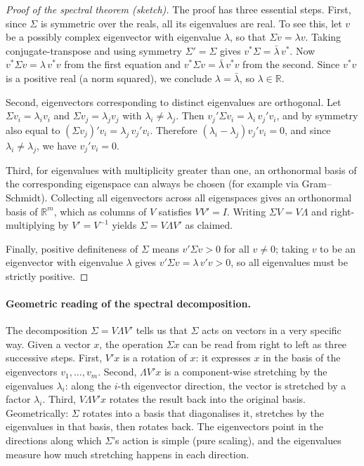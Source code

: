 \documentclass[11pt, a4paper, oneside]{article}
\begin{document}
\begin{proof}[Proof of the spectral theorem (sketch)]
The proof has three essential steps. First, since $\Sigma$ is symmetric
over the reals, all its eigenvalues are real. To see this, let $v$ be
a possibly complex eigenvector with eigenvalue $\lambda$, so that
$\Sigma v = \lambda v$. Taking conjugate-transpose and using symmetry
$\Sigma' = \Sigma$ gives $v^{*} \Sigma = \bar{\lambda}\, v^{*}$. Now
$v^{*} \Sigma v = \lambda\, v^{*} v$ from the first equation and
$v^{*} \Sigma v = \bar{\lambda}\, v^{*} v$ from the second. Since
$v^{*} v$ is a positive real (a norm squared), we conclude
$\lambda = \bar{\lambda}$, so $\lambda \in \mathbb{R}$.

Second, eigenvectors corresponding to distinct eigenvalues are
orthogonal. Let $\Sigma v_i = \lambda_i v_i$ and
$\Sigma v_j = \lambda_j v_j$ with $\lambda_i \neq \lambda_j$. Then
$v_j' \Sigma v_i = \lambda_i\, v_j' v_i$, and by symmetry also equal to
$(\Sigma v_j)' v_i = \lambda_j\, v_j' v_i$. Therefore
$(\lambda_i - \lambda_j) v_j' v_i = 0$, and since
$\lambda_i \neq \lambda_j$, we have $v_j' v_i = 0$.

Third, for eigenvalues with multiplicity greater than one, an orthonormal
basis of the corresponding eigenspace can always be chosen (for example
via Gram–Schmidt). Collecting all eigenvectors across all eigenspaces
gives an orthonormal basis of $\mathbb{R}^m$, which as columns of $V$
satisfies $V V' = I$. Writing $\Sigma V = V \Lambda$ and right-multiplying
by $V' = V^{-1}$ yields $\Sigma = V \Lambda V'$ as claimed.

Finally, positive definiteness of $\Sigma$ means $v' \Sigma v > 0$ for
all $v \neq 0$; taking $v$ to be an eigenvector with eigenvalue
$\lambda$ gives $v' \Sigma v = \lambda\, v' v > 0$, so all eigenvalues
must be strictly positive. \qedhere
\end{proof}

\paragraph{Geometric reading of the spectral decomposition.}
The decomposition $\Sigma = V \Lambda V'$ tells us that $\Sigma$ acts on
vectors in a very specific way. Given a vector $x$, the operation
$\Sigma x$ can be read from right to left as three successive steps.
First, $V' x$ is a rotation of $x$: it expresses $x$ in the basis of the
eigenvectors $v_1, \ldots, v_m$. Second, $\Lambda V' x$ is a
component-wise stretching by the eigenvalues $\lambda_i$: along the
$i$-th eigenvector direction, the vector is stretched by a factor
$\lambda_i$. Third, $V \Lambda V' x$ rotates the result back into the
original basis. Geometrically: $\Sigma$ rotates into a basis that
diagonalises it, stretches by the eigenvalues in that basis, then
rotates back. The eigenvectors point in the directions along which
$\Sigma$'s action is simple (pure scaling), and the eigenvalues measure
how much stretching happens in each direction.
\end{document}
